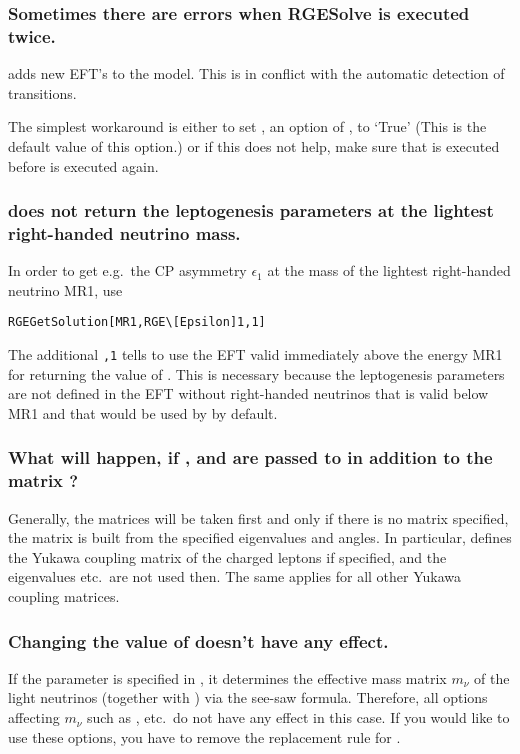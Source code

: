 \subsubsection{Sometimes there are errors when RGESolve is executed twice.}

 adds new EFT's to the model. This is in conflict with the automatic detection of transitions.

The simplest workaround is either to set
, an option of , to
`True' (This is the default value of this option.) or if this does not help, make sure that  is executed before  is executed again.


\subsubsection{ does not return the leptogenesis
  parameters at the lightest right-handed neutrino mass.}

In order to get e.g.\ the CP asymmetry $\epsilon_1$ at the mass of the
lightest right-handed neutrino MR1, use 

\begin{verbatim}
RGEGetSolution[MR1,RGE\[Epsilon]1,1]
\end{verbatim}

The additional \verb|,1| tells  to use the EFT
valid immediately above the energy MR1 for returning the value of
.  This is necessary because the leptogenesis
parameters are not defined in the EFT without right-handed neutrinos
that is valid below MR1 and that would be used by
 by default.


\subsubsection{What will happen, if ,  and
   are passed to  in addition to the
  matrix ?}
Generally, the matrices will be taken first and only if there is no matrix specified, the
  matrix is built from the specified eigenvalues and angles. In particular,
   defines the Yukawa coupling matrix of the charged
  leptons if specified, and the eigenvalues  etc.\ are not
  used then. The same applies for all other Yukawa coupling matrices.
  
\subsubsection{Changing the value of  doesn't have
  any effect.}
If the parameter  is specified in
, it determines the effective mass matrix
$m_\nu$ of the light neutrinos (together with ) via the
see-saw formula.  Therefore, all options affecting $m_\nu$ such as
,  etc.\ do not have any effect
in this case.  If you would like to use these options, you have to
remove the replacement rule for .
